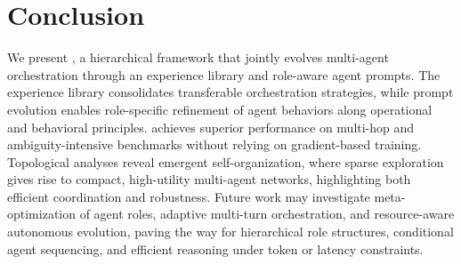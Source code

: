 
\section{Conclusion}

\label{sec:cond}
We present \hero, a hierarchical framework that jointly evolves multi-agent orchestration through an experience library and role-aware agent prompts. The experience library consolidates transferable orchestration strategies, while prompt evolution enables role-specific refinement of agent behaviors along operational and behavioral principles. \hero achieves superior  performance on multi-hop and ambiguity-intensive benchmarks without relying on gradient-based training. Topological analyses reveal emergent self-organization, where sparse exploration gives rise to compact, high-utility multi-agent networks, highlighting both efficient coordination and robustness. Future work may investigate meta-optimization of agent roles, adaptive multi-turn orchestration, and resource-aware autonomous evolution, paving the way for hierarchical role structures, conditional agent sequencing, and efficient reasoning under token or latency constraints.


